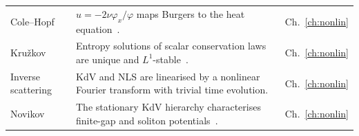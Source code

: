 \begin{center}
\begin{longtable}{@{}L{3.5cm}L{8.6cm}L{2.2cm}@{}}
Cole--Hopf & $u=-2\nu\varphi_x/\varphi$ maps Burgers to the heat equation~\cite{ch}. & Ch.~\ref{ch:nonlin}\\
Kru\v zkov & Entropy solutions of scalar conservation laws are unique and $L^1$-stable~\cite{kr}. & Ch.~\ref{ch:nonlin}\\
Inverse scattering & KdV and NLS are linearised by a nonlinear Fourier transform with trivial time evolution. & Ch.~\ref{ch:nonlin}\\
Novikov & The stationary KdV hierarchy characterises finite-gap and soliton potentials~\cite{no}. & Ch.~\ref{ch:nonlin}\\
\bottomrule
\end{longtable}
\end{center}
